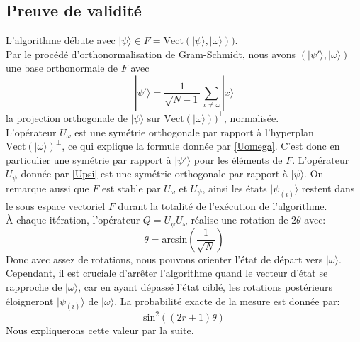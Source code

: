 

\subsection{Preuve de validité}

L'algorithme débute avec $|\psi \rangle \in F = \mathrm{Vect}(|\psi \rangle , |\omega \rangle ))$. 
\\
Par le procédé d'orthonormalisation de Gram-Schmidt, nous avons $(|\psi' \rangle, | \omega \rangle)$ une base orthonormale de $F$ avec 
\[|\psi'\rangle = \frac{1}{\sqrt{N-1}}\sum_{x \neq \omega} |x \rangle\]
la projection orthogonale de $|\psi \rangle$ sur $\mathrm{Vect}(|\omega \rangle ))^{\perp}$, normalisée. 
\\
L'opérateur $U_{\omega}$ est une symétrie orthogonale par rapport à l'hyperplan $\mathrm{Vect}(|\omega \rangle)^{\perp}$, ce qui explique la formule donnée par \eqref{Uomega}. C'est donc en particulier une symétrie par rapport à $|\psi'\rangle$ pour les éléments de $F$.
L'opérateur $U_{\psi}$ donnée par \eqref{Upsi} est une symétrie orthogonale par rapport à $|\psi\rangle$.
On remarque aussi que $F$ est stable par $U_{\omega}$ et $U_{\psi}$, ainsi les états $|\psi_{(i)} \rangle$ restent dans le sous espace vectoriel $F$ durant la totalité de l'exécution de l'algorithme.
\\
À chaque itération, l'opérateur $Q=U_{\psi} U_{\omega}$ réalise une rotation de $2\theta$ avec:
\[\theta = \mathrm{arcsin}(\frac{1}{\sqrt{N}})\]
Donc avec assez de rotations, nous pouvons orienter l'état de départ vers $|\omega \rangle$.
Cependant, il est cruciale d'arrêter l'algorithme quand le vecteur d'état se rapproche de $|\omega \rangle$, car en ayant dépassé l'état ciblé, les rotations postérieurs éloigneront $|\psi_{(i)} \rangle$ de $|\omega \rangle$.
La probabilité exacte de la mesure est donnée par:
\[\mathrm{sin}^2 \left( \left( 2r + 1 \right) \theta \right) \]
Nous expliquerons cette valeur par la suite. 
